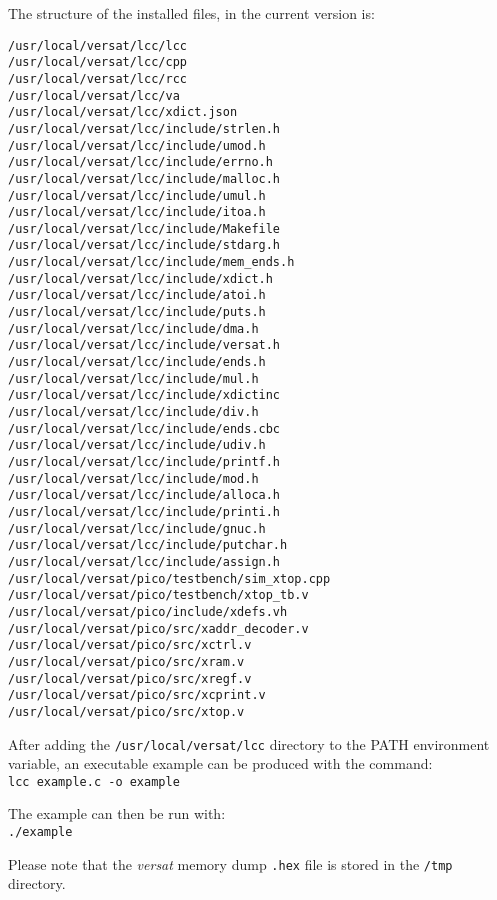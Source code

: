 The structure of the installed files,
in the current version is:
\begin{Verbatim}[baselinestretch=1.0]
/usr/local/versat/lcc/lcc
/usr/local/versat/lcc/cpp
/usr/local/versat/lcc/rcc
/usr/local/versat/lcc/va
/usr/local/versat/lcc/xdict.json
/usr/local/versat/lcc/include/strlen.h
/usr/local/versat/lcc/include/umod.h
/usr/local/versat/lcc/include/errno.h
/usr/local/versat/lcc/include/malloc.h
/usr/local/versat/lcc/include/umul.h
/usr/local/versat/lcc/include/itoa.h
/usr/local/versat/lcc/include/Makefile
/usr/local/versat/lcc/include/stdarg.h
/usr/local/versat/lcc/include/mem_ends.h
/usr/local/versat/lcc/include/xdict.h
/usr/local/versat/lcc/include/atoi.h
/usr/local/versat/lcc/include/puts.h
/usr/local/versat/lcc/include/dma.h
/usr/local/versat/lcc/include/versat.h
/usr/local/versat/lcc/include/ends.h
/usr/local/versat/lcc/include/mul.h
/usr/local/versat/lcc/include/xdictinc
/usr/local/versat/lcc/include/div.h
/usr/local/versat/lcc/include/ends.cbc
/usr/local/versat/lcc/include/udiv.h
/usr/local/versat/lcc/include/printf.h
/usr/local/versat/lcc/include/mod.h
/usr/local/versat/lcc/include/alloca.h
/usr/local/versat/lcc/include/printi.h
/usr/local/versat/lcc/include/gnuc.h
/usr/local/versat/lcc/include/putchar.h
/usr/local/versat/lcc/include/assign.h
/usr/local/versat/pico/testbench/sim_xtop.cpp
/usr/local/versat/pico/testbench/xtop_tb.v
/usr/local/versat/pico/include/xdefs.vh
/usr/local/versat/pico/src/xaddr_decoder.v
/usr/local/versat/pico/src/xctrl.v
/usr/local/versat/pico/src/xram.v
/usr/local/versat/pico/src/xregf.v
/usr/local/versat/pico/src/xcprint.v
/usr/local/versat/pico/src/xtop.v
\end{Verbatim}

After adding the {\tt /usr/local/versat/lcc} directory to
the {\sc PATH} environment variable, an executable example
can be produced with the command:\\
{\tt lcc example.c -o example}

The example can then be run with:\\
{\tt ./example}

Please note that the {\it versat} memory dump {\tt .hex}
file is stored in the {\tt /tmp} directory.

\cleardoublepage
